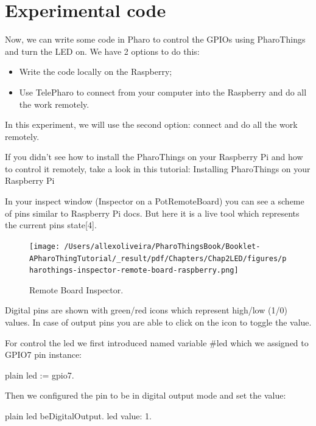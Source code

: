 \documentclass[10pt,twoside,english]{_support/latex/sbabook/sbabook}
\begin{document}
\section{Experimental code}
Now, we can write some code in Pharo to control the GPIOs using PharoThings and turn the LED on. We have 2 options to do this:

\begin{itemize}
\item Write the code locally on the Raspberry;
\item Use TelePharo to connect from your computer into the Raspberry and do all the work remotely.
\end{itemize}

In this experiment, we will use the second option: connect and do all the work remotely. 

If you didn’t see how to install the PharoThings on your Raspberry Pi and how to control it remotely, take a look in this tutorial: Installing PharoThings on your Raspberry Pi

In your inspect window (Inspector on a PotRemoteBoard) you can see a scheme of pins similar to Raspberry Pi docs. But here it is a live tool which represents the current pins state{[}4{]}.


\begin{figure}

\begin{center}
\texttt{[image: /Users/allexoliveira/PharoThingsBook/Booklet-APharoThingTutorial/\_result/pdf/Chapters/Chap2LED/figures/pharothings-inspector-remote-board-raspberry.png]}\caption{Remote Board Inspector.\label{remoteBoard}}\end{center}
\end{figure}


Digital pins are shown with green/red icons which represent high/low (1/0) values. In case of output pins you are able to click on the icon to toggle the value.

For control the led we first introduced named variable \#led which we assigned to GPIO7 pin instance:

\begin{displaycode}{plain}
led := gpio7.
\end{displaycode}

Then we configured the pin to be in digital output mode and set the value:

\begin{displaycode}{plain}
led beDigitalOutput.
led value: 1.
\end{displaycode}
\end{document}
